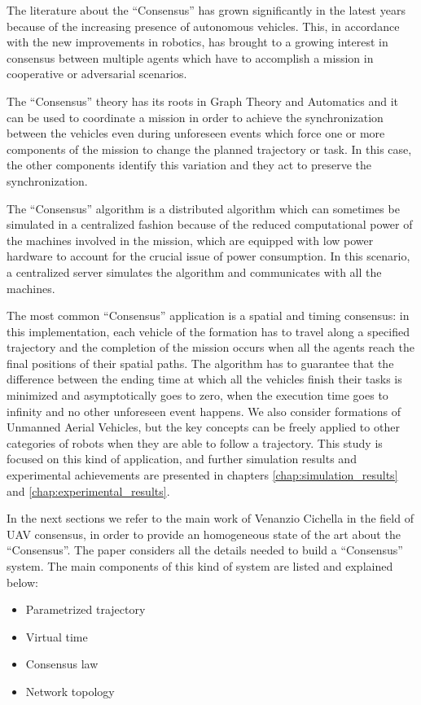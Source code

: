 The literature about the “Consensus” has grown significantly in the latest years
because of the increasing presence of autonomous vehicles. This, in accordance with
the new improvements in robotics, has brought to a growing interest in consensus
between multiple agents which have to accomplish a mission in cooperative or adversarial
scenarios.

The “Consensus” theory has its roots in Graph Theory and Automatics and it can
be used to coordinate a mission in order to achieve the synchronization between
the vehicles even during unforeseen events which force one or more
components of the mission to change the planned trajectory or task. In this case,
the other components identify this variation and they act to preserve the
synchronization.

The “Consensus” algorithm is a distributed algorithm which can sometimes be simulated
in a centralized fashion because of the reduced computational power of the machines
involved in the mission, which are equipped with low power hardware to account for
the crucial issue of power consumption.
In this scenario, a centralized server simulates the algorithm and communicates with
all the machines.

The most common “Consensus” application is a spatial and timing consensus: in this
implementation, each vehicle of the formation has to travel along a specified trajectory and the
completion of the mission occurs when all the agents reach the final positions of their
spatial paths. The algorithm has to guarantee that the difference between
the ending time at which all the vehicles finish their tasks is minimized and
asymptotically goes to zero, when the execution time goes to infinity and no other
unforeseen event happens.
We also consider formations of Unmanned Aerial Vehicles, but the key concepts can
be freely applied to other categories of robots when they are able to follow a trajectory.
This study is focused on this kind of application, and further
simulation results and experimental achievements are presented in chapters
\ref{chap:simulation_results} and \ref{chap:experimental_results}.

In the next sections we refer to the main work of Venanzio Cichella \cite{cichellaMain}
in the field of UAV consensus, in order to provide an homogeneous state of the art
about the “Consensus”.
The paper considers all the details needed to build a “Consensus” system.
The main components of this kind of system are listed and explained below:
\begin{itemize}
  \item Parametrized trajectory
  \item Virtual time
  \item Consensus law
  \item Network topology
\end{itemize}












